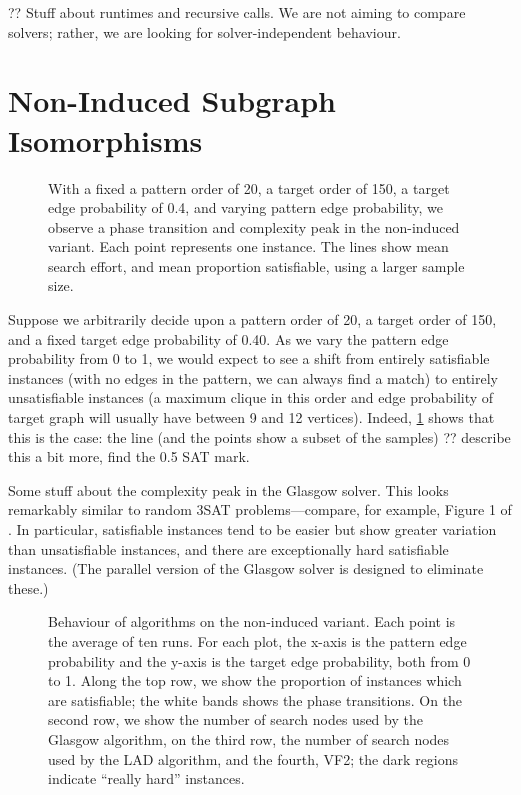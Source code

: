 \documentclass[letterpaper]{article}
\begin{document}
?? Stuff about runtimes and recursive calls. We are not aiming to compare solvers; rather, we are
looking for solver-independent behaviour.

\section{Non-Induced Subgraph Isomorphisms}

\begin{figure}[t]
    
    \caption{With a fixed a pattern order of 20, a target order of 150, a target edge probability of 0.4, and
    varying pattern edge probability, we observe a phase transition and complexity peak in the non-induced
    variant. Each point represents one instance. The lines show mean search effort, and mean
    proportion satisfiable, using a larger sample size.}
    \label{figure:phase-transition}
\end{figure}

Suppose we arbitrarily decide upon a pattern order of 20, a target order of 150, and a fixed target
edge probability of 0.40. As we vary the pattern edge probability from 0 to 1, we would expect to see a shift from
entirely satisfiable instances (with no edges in the pattern, we can always find a match) to
entirely unsatisfiable instances (a maximum clique in this order and edge probability of target graph will
usually have between 9 and 12 vertices). Indeed, \cref{figure:phase-transition} shows that this is
the case: the line (and the points show a subset of the samples) ?? describe this a bit more, find
the 0.5 SAT mark.

Some stuff about the complexity peak in the Glasgow solver. This looks remarkably similar to random
3SAT problems---compare, for example, Figure 1 of \citet{LeytonBrown:2014}. In particular,
satisfiable instances tend to be easier but show greater variation than unsatisfiable instances, and
there are exceptionally hard satisfiable instances. (The parallel version of the Glasgow solver is
designed to eliminate these.)

\begin{figure}[tb]
    
    \caption{Behaviour of algorithms on the non-induced variant. Each point is the average of ten
        runs. For each plot, the x-axis is the pattern edge probability and the y-axis is the target
        edge probability, both from 0 to 1. Along the top row, we show the proportion of instances which are
        satisfiable; the white bands shows the phase transitions. On the second row, we show the
        number of search nodes used by the Glasgow algorithm, on the third row, the number of
        search nodes used by the LAD algorithm, and the fourth, VF2; the dark regions indicate
        ``really hard'' instances.}
    \label{figure:non-induced}
\end{figure}
\end{document}
